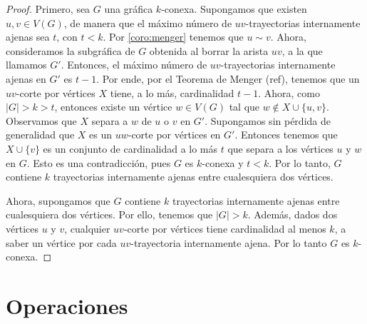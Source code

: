  \begin{proof}
     Primero, sea $G$ una gr\'afica $k$-conexa. Supongamos que existen $u,v \in
     V(G)$, de manera que el m\'aximo n\'umero de $uv$-trayectorias internamente
     ajenas sea $t$, con $t<k$. Por \cref{coro:menger} tenemos
     que $u \sim v$. Ahora, consideramos la subgr\'afica de $G$ obtenida al
     borrar la arista $uv$, a la que llamamos $G'$. Entonces, el m\'aximo
     n\'umero de $uv$-trayectorias internamente ajenas en $G'$ es $t-1$. Por
     ende, por el Teorema de Menger (ref), tenemos que un $uv$-corte por
     v\'ertices $X$ tiene, a lo m\'as, cardinalidad $t-1$. Ahora, como $|G| > k
     > t$, entonces existe un v\'ertice $w \in V(G)$ tal que $w \notin
     X\cup\{u,v\}$. Observamos que $X$ separa a $w$ de $u$ o $v$ en $G'$.
     Supongamos sin p\'erdida de generalidad que $X$ es un $uw$-corte por
     v\'ertices en $G'$. Entonces tenemos que $X\cup\{v\}$ es un conjunto de
     cardinalidad a lo m\'as $t$ que separa a los v\'ertices $u$ y $w$ en $G$.
     Esto es una contradicci\'on, pues $G$ es $k$-conexa y $t < k$. Por lo
     tanto, $G$ contiene $k$ trayectorias internamente ajenas entre cualesquiera
     dos v\'ertices.
 
     Ahora, supongamos que $G$ contiene $k$ trayectorias internamente ajenas
     entre cualesquiera dos v\'ertices. Por ello, tenemos que $|G|>k$. Adem\'as,
     dados dos v\'ertices $u$ y $v$, cualquier $uv$-corte por v\'ertices tiene
     cardinalidad al menos $k$, a saber un v\'ertice por cada $uv$-trayectoria
     internamente ajena. Por lo tanto $G$ es $k$-conexa.
         
 \end{proof}
 

\section{Operaciones}
\label{sec:operaciones}

